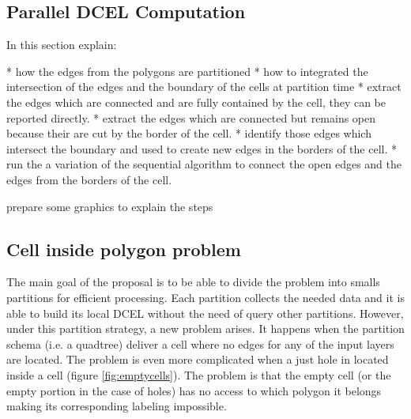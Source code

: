 \subsection{Parallel DCEL Computation}
In this section explain:

* how the edges from the polygons are partitioned
* how to integrated the intersection of the edges and the boundary of the cells at partition time
* extract the edges which are connected and are fully contained by the cell, they can be reported directly.
* extract the edges which are connected but remains open because their are cut by the border of the cell.
* identify those edges which intersect the boundary and used to create new edges in the borders of the cell.  
* run the a variation of the sequential algorithm to connect the open edges and the edges from the borders of the cell.

prepare some graphics to explain the steps


\subsection{Cell inside polygon problem} \label{sec:anomalies}
The main goal of the proposal is to be able to divide the problem into smalls partitions for efficient processing.  Each partition collects the needed data and it is able to build its local DCEL without the need of query other partitions.  However, under this partition strategy, a new problem arises.  It happens when the partition schema (i.e. a quadtree) deliver a cell where no edges for any of the input layers are located.  The problem is even more complicated when a just hole in located inside a cell (figure \ref{fig:emptycells}).  The problem is that the empty cell (or the empty portion in the case of holes) has no access to which polygon it belongs making its corresponding labeling impossible.  

